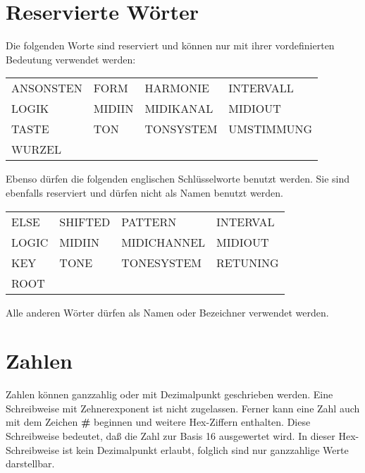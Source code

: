 \section{Reservierte Wörter}\label{sec:reservierte-worte}
\label{zweivier}

Die  folgenden  Worte sind reserviert
 und können  nur  mit  ihrer
vordefinierten Bedeutung verwendet werden:

\begin{center}
\begin{tabular}{|llll|}
	      \hline
   ANSONSTEN & FORM   & HARMONIE & INTERVALL \\
   LOGIK  & MIDIIN   & MIDIKANAL & MIDIOUT    \\
   TASTE     & TON    & TONSYSTEM &   UMSTIMMUNG \\
   WURZEL    &        &           &              \\
 \hline
\end{tabular}
\end{center}

Ebenso dürfen die folgenden englischen Schlüsselworte
benutzt werden. Sie sind ebenfalls reserviert und
dürfen nicht als Namen benutzt werden.

\begin{center}
\begin{tabular}{|llll|}
	      \hline
   ELSE & SHIFTED   & PATTERN & INTERVAL \\
   LOGIC  & MIDIIN   & MIDICHANNEL & MIDIOUT    \\
   KEY     & TONE    & TONESYSTEM &  RETUNING \\
   ROOT    &        &           &              \\
 \hline
\end{tabular}
\end{center}

Alle anderen Wörter dürfen als Namen oder Bezeichner verwendet werden.

\section{Zahlen}\label{sec:zahlen}
\label{zweifuenf}

Zahlen können ganzzahlig oder mit Dezimalpunkt geschrieben werden.
Eine Schreibweise mit Zehnerexponent ist nicht
zugelassen. Ferner kann eine Zahl auch mit dem Zeichen
\textbf{\#}\index{\#} beginnen und weitere Hex-Ziffern
enthalten. Diese Schreibweise bedeutet, daß die Zahl zur Basis 16
ausgewertet wird. In dieser Hex-Schreibweise ist kein Dezimalpunkt
erlaubt, folglich sind nur ganzzahlige Werte darstellbar.

